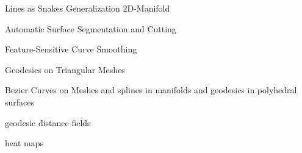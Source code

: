 \documentclass{stdlocal}
\begin{document}
  Lines as Snakes
  \autocite{kass1988}
  Generalization 2D-Manifold
  \autocite{bischoff2005}
  \autocite{jung2004}

  Automatic Surface Segmentation and Cutting
  \autocite{lee2002}
  \autocite{lee2004}

  Feature-Sensitive Curve Smoothing
  \autocite{lai2007}

  Geodesics on Triangular Meshes
  \autocite{martinez2005}

  Bezier Curves on Meshes
  \autocite{martinez2007}
  and splines in manifolds
  \autocite{hofer2004}
  and geodesics in polyhedral surfaces
  \autocite{polthier2006}
  \autocite{mitchell1987}
  \autocite{surazhsky2005}

  geodesic distance fields
  \autocite{bommes2007}
  \autocite{kimmel1996}

  heat maps
  \autocite{crane2013}

  \autocite{dijkstra1959}

  \autocite{ma2007}
  \autocite{pottmann2005}
  \autocite{levy2002}

  \autocite{mancinelli2022}

  \autocite{yu2021}

  \autocite{engelke2018}

\end{document}
